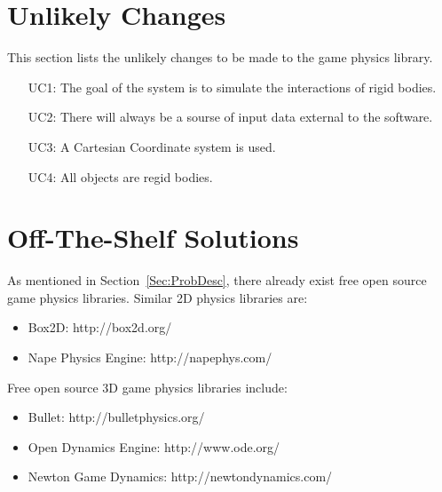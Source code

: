 \documentclass[12pt]{article}
\begin{document}
\section{Unlikely Changes}
\label{Sec:UCs}
This section lists the unlikely changes to be made to the game physics library.
\begin{itemize}
\item[UC1:]The goal of the system is to simulate the interactions of rigid bodies.
\item[UC2:]There will always be a sourse of input data external to the software.
\item[UC3:]A Cartesian Coordinate system is used.
\item[UC4:]All objects are regid bodies.
\end{itemize}
\section{Off-The-Shelf Solutions}
\label{Sec:ExistingSolns}
As mentioned in Section~\ref{Sec:ProbDesc}, there already exist free open source game physics libraries. Similar 2D physics libraries are:
\begin{itemize}
\item{Box2D: http://box2d.org/}
\item{Nape Physics Engine: http://napephys.com/}
\end{itemize}
Free open source 3D game physics libraries include:
\begin{itemize}
\item{Bullet: http://bulletphysics.org/}
\item{Open Dynamics Engine: http://www.ode.org/}
\item{Newton Game Dynamics: http://newtondynamics.com/}
\end{itemize}
\end{document}
